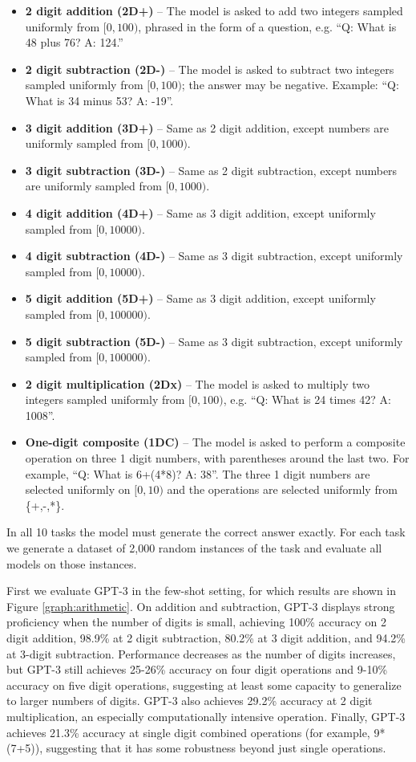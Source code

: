 \begin{itemize}
    \item \textbf{2 digit addition (2D+)} -- The model is asked to add two integers sampled uniformly from $[0, 100)$, phrased in the form of a question, e.g. ``Q: What is 48 plus 76? A: 124.''
    \item \textbf{2 digit subtraction (2D-)} -- The model is asked to subtract two integers sampled uniformly from $[0, 100)$; the answer may be negative.  Example: ``Q: What is 34 minus 53? A: -19''.
    \item \textbf{3 digit addition (3D+)} -- Same as 2 digit addition, except numbers are uniformly sampled from $[0, 1000)$.
    \item \textbf{3 digit subtraction (3D-)} -- Same as 2 digit subtraction, except numbers are uniformly sampled from $[0, 1000)$.
    \item \textbf{4 digit addition (4D+)} -- Same as 3 digit addition, except uniformly sampled from $[0, 10000)$.
    \item \textbf{4 digit subtraction (4D-)} -- Same as 3 digit subtraction, except uniformly sampled from $[0, 10000)$.
    \item \textbf{5 digit addition (5D+)} -- Same as 3 digit addition, except uniformly sampled from $[0, 100000)$.
    \item \textbf{5 digit subtraction (5D-)} -- Same as 3 digit subtraction, except uniformly sampled from $[0, 100000)$.
   \item \textbf{2 digit multiplication (2Dx)} -- The model is asked to multiply two integers sampled uniformly from $[0, 100)$, e.g. ``Q: What is 24 times 42? A: 1008''.
    \item \textbf{One-digit composite (1DC)} -- The model is asked to perform a composite operation on three 1 digit numbers, with parentheses around the last two. For example, ``Q: What is 6+(4*8)? A: 38''. The three 1 digit numbers are selected uniformly on $[0, 10)$ and the operations are selected uniformly from \{+,-,*\}.
\end{itemize}

In all 10 tasks the model must generate the correct answer exactly. For each task we generate a dataset of 2,000 random instances of the task and evaluate all models on those instances.

First we evaluate GPT-3 in the few-shot setting, for which results are shown in Figure \ref{graph:arithmetic}.  On addition and subtraction, GPT-3 displays strong proficiency when the number of digits is small, achieving 100\% accuracy on 2 digit addition, 98.9\% at 2 digit subtraction, 80.2\% at 3 digit addition, and 94.2\% at 3-digit subtraction.  Performance decreases as the number of digits increases, but GPT-3 still achieves 25-26\% accuracy on four digit operations and 9-10\% accuracy on five digit operations, suggesting at least some capacity to generalize to larger numbers of digits.  GPT-3 also achieves 29.2\% accuracy at 2 digit multiplication, an especially computationally intensive operation. Finally, GPT-3 achieves 21.3\% accuracy at single digit combined operations (for example, 9*(7+5)), suggesting that it has some robustness beyond just single operations.

